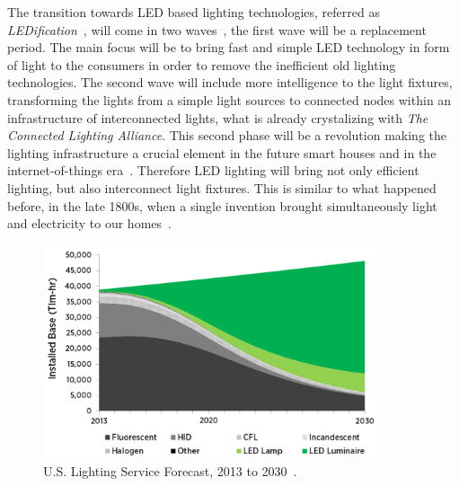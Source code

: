 The transition towards LED based lighting technologies, referred as \emph{LEDification}~\cite{13Hammerschmidt,15crawford}, will come in two waves~\cite{13liedenbaum}, the first wave will be a replacement period. The main focus will be to bring fast and simple LED technology in form of light to the consumers in order to remove the inefficient old lighting technologies. The second wave will include more intelligence to the light fixtures, transforming the lights from a simple light sources to connected nodes within an infrastructure of interconnected lights, what is already crystalizing with \emph{The Connected Lighting Alliance}. This second phase will be a revolution making the lighting infrastructure a crucial element in the future smart houses and in the internet-of-things era~\cite{14Harbers}. Therefore LED lighting will bring not only efficient lighting, but also interconnect light fixtures. This is similar to what happened before, in the late 1800s, when a single invention brought simultaneously light and electricity to our homes~\cite{14NYISO}.

\begin{figure}[!h]
\centering
\includegraphics[width=10cm]{./0_intro/img/lighting_forecast.png}
\caption{U.S. Lighting Service Forecast, 2013 to 2030~\cite{14USDoE}.  }
\label{fig:lighting_forecast}
\end{figure}

